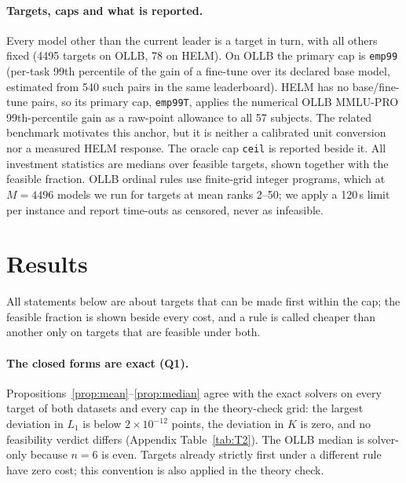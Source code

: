\documentclass{article}
\begin{document}
\paragraph{Targets, caps and what is reported.}
Every model other than the current leader is a target in turn, with all others fixed (4495 targets on OLLB, 78 on HELM). On OLLB the primary cap is \texttt{emp99} (per-task 99th percentile of the gain of a fine-tune over its declared base model, estimated from 540 such pairs in the same leaderboard). HELM has no base/fine-tune pairs, so its primary cap, \texttt{emp99T}, applies the numerical OLLB MMLU-PRO 99th-percentile gain as a raw-point allowance to all 57 subjects. The related benchmark motivates this anchor, but it is neither a calibrated unit conversion nor a measured HELM response. The oracle cap \texttt{ceil} is reported beside it. All investment statistics are medians over feasible targets, shown together with the feasible fraction. OLLB ordinal rules use finite-grid integer programs, which at $M=4496$ models we run for targets at mean ranks 2--50; we apply a 120\,s limit per instance and report time-outs as censored, never as infeasible.

\section{Results}
\label{sec:results}
All statements below are about targets that can be made first within the cap; the feasible fraction is shown beside every cost, and a rule is called cheaper than another only on targets that are feasible under both.

\paragraph{The closed forms are exact (Q1).}
Propositions~\ref{prop:mean}--\ref{prop:median} agree with the exact solvers on every target of both datasets and every cap in the theory-check grid: the largest deviation in $L_1$ is below $2\times10^{-12}$ points, the deviation in $K$ is zero, and no feasibility verdict differs (Appendix Table~\ref{tab:T2}). The OLLB median is solver-only because $n=6$ is even. Targets already strictly first under a different rule have zero cost; this convention is also applied in the theory check.
\end{document}
